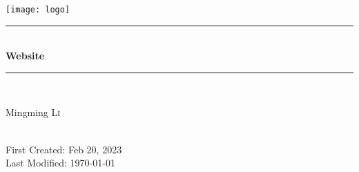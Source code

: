 \newcommand{\mytitle}{Website}
\newcommand{\firstcreated}{Feb 20, 2023}

\begin{titlepage}

\newcommand{\HRule}{\rule{\linewidth}{0.5mm}} %

\center                         %
 

\texttt{[image: logo]}\\[1cm] %


\HRule\\[0.4cm]
{ \huge \bfseries \mytitle}\\[0.4cm] %
\HRule\\[1.5cm]
 

\begin{minipage}{0.4\textwidth}
\begin{center} \large
Mingming \textsc{Li}\\ %
\end{center}

\end{minipage}\\[2cm]


\vfill
{\large First Created: \firstcreated}\\
{\large Last Modified: \today}\\[2cm] %



\end{titlepage}



